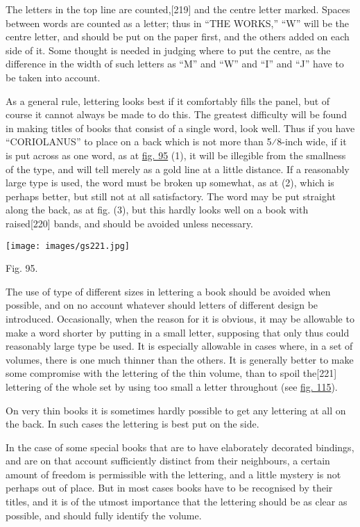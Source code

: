 \documentclass[
]{article}
\begin{document}
The letters in the top line are
counted,{\protect\hypertarget{Page_219}{}{{[}219{]}}} and the centre
letter marked. Spaces between words are counted as a letter; thus in
``THE WORKS,'' ``W'' will be the centre letter, and should be put on the
paper first, and the others added on each side of it. Some thought is
needed in judging where to put the centre, as the difference in the
width of such letters as ``M'' and ``W'' and ``I'' and ``J'' have to be
taken into account.

As a general rule, lettering looks best if it comfortably fills the
panel, but of course it cannot always be made to do this. The greatest
difficulty will be found in making titles of books that consist of a
single word, look well. Thus if you have ``CORIOLANUS'' to place on a
back which is not more than {5}⁄{8}-inch wide, if it is put across as
one word, as at \protect\hyperlink{Fig_95}{fig. 95} (1), it will be
illegible from the smallness of the type, and will tell merely as a gold
line at a little distance. If a reasonably large type is used, the word
must be broken up somewhat, as at (2), which is perhaps better, but
still not at all satisfactory. The word may be put straight along the
back, as at fig. (3), but this hardly looks well on a book with
raised{\protect\hypertarget{Page_220}{}{{[}220{]}}} bands, and should be
avoided unless necessary.

\protect\hypertarget{Fig_95}{}{}
\texttt{[image: images/gs221.jpg]}

Fig. 95.

The use of type of different sizes in lettering a book should be avoided
when possible, and on no account whatever should letters of different
design be introduced. Occasionally, when the reason for it is obvious,
it may be allowable to make a word shorter by putting in a small letter,
supposing that only thus could reasonably large type be used. It is
especially allowable in cases where, in a set of volumes, there is one
much thinner than the others. It is generally better to make some
compromise with the lettering of the thin volume, than to spoil
the{\protect\hypertarget{Page_221}{}{{[}221{]}}} lettering of the whole
set by using too small a letter throughout (see
\protect\hyperlink{Fig_115}{fig. 115}).

On very thin books it is sometimes hardly possible to get any lettering
at all on the back. In such cases the lettering is best put on the side.

In the case of some special books that are to have elaborately decorated
bindings, and are on that account sufficiently distinct from their
neighbours, a certain amount of freedom is permissible with the
lettering, and a little mystery is not perhaps out of place. But in most
cases books have to be recognised by their titles, and it is of the
utmost importance that the lettering should be as clear as possible, and
should fully identify the volume.
\end{document}
